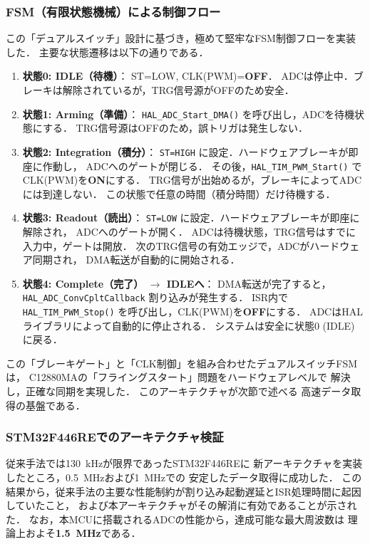 \documentclass[main]{subfiles}
\begin{document}
\subsubsection{FSM（有限状態機械）による制御フロー}
この「デュアルスイッチ」設計に基づき，極めて堅牢なFSM制御フローを実装した．
主要な状態遷移は以下の通りである．

\begin{enumerate}
    \item \textbf{状態0: IDLE（待機）}：
    ST=LOW, CLK(PWM)=\textbf{OFF}．
    ADCは停止中．ブレーキは解除されているが，TRG信号源がOFFのため安全．
    
    \item \textbf{状態1: Arming（準備）}：
    \texttt{HAL\_ADC\_Start\_DMA()} を呼び出し，ADCを待機状態にする．
    TRG信号源はOFFのため，誤トリガは発生しない．
    
    \item \textbf{状態2: Integration（積分）}：
    \texttt{ST=HIGH} に設定．ハードウェアブレーキが即座に作動し，
    ADCへのゲートが閉じる．
    その後，\texttt{HAL\_TIM\_PWM\_Start()} でCLK(PWM)を\textbf{ON}にする．
    TRG信号が出始めるが，ブレーキによってADCには到達しない．
    この状態で任意の時間（積分時間）だけ待機する．
    
    \item \textbf{状態3: Readout（読出）}：
    \texttt{ST=LOW} に設定．ハードウェアブレーキが即座に解除され，
    ADCへのゲートが開く．
    ADCは待機状態，TRG信号はすでに入力中，ゲートは開放．
    次のTRG信号の有効エッジで，ADCがハードウェア同期され，
    DMA転送が自動的に開始される．
    
    \item \textbf{状態4: Complete（完了） $\rightarrow$ IDLEへ}：
    DMA転送が完了すると，\texttt{HAL\_ADC\_ConvCpltCallback} 割り込みが発生する．
    ISR内で \texttt{HAL\_TIM\_PWM\_Stop()} を呼び出し，CLK(PWM)を\textbf{OFF}にする．
    ADCはHALライブラリによって自動的に停止される．
    システムは安全に状態0 (IDLE) に戻る．
\end{enumerate}

この「ブレーキゲート」と「CLK制御」を組み合わせたデュアルスイッチFSMは，
C12880MAの「フライングスタート」問題をハードウェアレベルで
解決し，正確な同期を実現した．
このアーキテクチャが次節で述べる
高速データ取得の基盤である．

\subsubsection{STM32F446REでのアーキテクチャ検証}
従来手法では\SI{130}{\kilo\hertz}が限界であったSTM32F446REに
新アーキテクチャを実装したところ，\SI{0.5}{\mega\hertz}および\SI{1}{\mega\hertz}での
安定したデータ取得に成功した．
この結果から，従来手法の主要な性能制約が割り込み起動遅延とISR処理時間に起因していたこと，
および本アーキテクチャがその解消に有効であることが示された．
なお，本MCUに搭載されるADCの性能から，達成可能な最大周波数は
理論上およそ\textbf{\SI{1.5}{\mega\hertz}}である．
\end{document}
